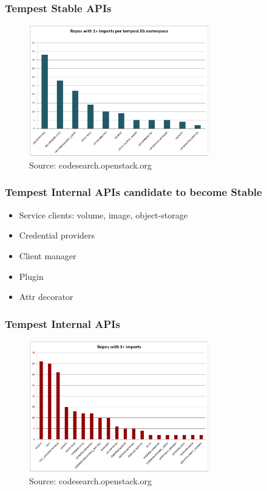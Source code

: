 \documentclass[aspectratio=169,11pt,hyperref={colorlinks=true}]{beamer}
\begin{document}
\begin{frame}
    \frametitle{Tempest Stable APIs}
    \begin{figure}[p]
    	\centering
    	\includegraphics[width=0.7\textwidth]{lib-imports.png}
    	\caption{Source: codesearch.openstack.org}
    \end{figure}
\end{frame}

\begin{frame}
    \frametitle{Tempest Internal APIs candidate to become Stable}
    \begin{itemize}
        \item{Service clients: volume, image, object-storage}
        \item{Credential providers}
        \item{Client manager}
        \item{Plugin}
        \item{Attr decorator}
    \end{itemize}
\end{frame}

\begin{frame}
    \frametitle{Tempest Internal APIs}
    \begin{figure}[p]
    	\centering
    	\includegraphics[width=0.7\textwidth]{tempest-imports.png}
    	\caption{Source: codesearch.openstack.org}
    \end{figure}
\end{frame}
\end{document}
